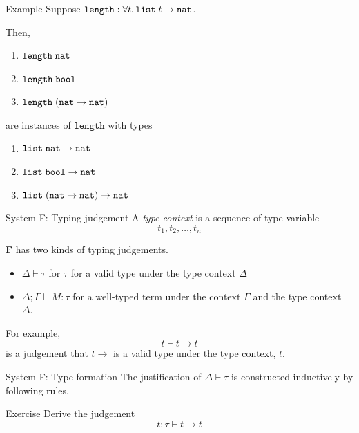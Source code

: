 \begin{frame}{Example}
  Suppose $\mathtt{length} : \forall t.\,\List\;t \to \nat$. 

  Then, 
  \begin{enumerate}
    \item $\mathtt{length}\;\nat$
    \item $\mathtt{length}\;\bool$
    \item $\mathtt{length}\;(\nat \to \nat)$
  \end{enumerate}
  are instances of $\mathtt{length}$ with types
  \begin{enumerate}
     \item $\List\; \nat \to \nat$
     \item $\List\;\bool \to \nat$
     \item $\List\;(\nat \to \nat) \to \nat$
  \end{enumerate}
\end{frame}

\begin{frame}{System F: Typing judgement}
  A \emph{type context} is a sequence of type variable 
  \[
    t_1, t_2, \dots, t_n
  \]

  \textbf{F} has two kinds of typing judgements.
  \begin{itemize}
    \item $\Delta \vdash \tau$ for $\tau$ for a valid type under the type context $\Delta$
    \item $\Delta; \Gamma \vdash M : \tau$ for a well-typed term under the context $\Gamma$ and the type context~$\Delta$.
  \end{itemize}
  For example,
    \[
      t \vdash t \to t
    \]
    is a judgement that $t \to $ is a valid type under the type context, $t$.

\end{frame}

\begin{frame}{System F: Type formation}
  The justification of $\Delta \vdash \tau$ is constructed inductively by following rules.
  \begin{multicols}{2}
    \begin{prooftree}
    \end{prooftree}
    \begin{prooftree}
    \end{prooftree}
    \columnbreak
    \begin{prooftree}
    \end{prooftree}
  \end{multicols}

  \begin{block}{Exercise}
    Derive the judgement 
    \[
        t : \tau \vdash t \to t
    \]
  \end{block}
\end{frame}

